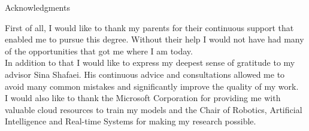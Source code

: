 \makeatletter
{}
\makeatother
\thispagestyle{empty}
\vspace*{20mm}
\begin{center}
\makeatletter
{} Acknowledgments
\makeatother
\end{center}
\vspace{10mm}
First of all, I would like to thank my parents for their continuous support that enabled me to pursue this degree. Without their help I would not have had many of the opportunities that got me where I am today.\\
In addition to that I would like to express my deepest sense of gratitude to my advisor Sina Shafaei. His continuous advice and consultations allowed me to avoid many common mistakes and significantly improve the quality of my work.\\
I would also like to thank the Microsoft Corporation for providing me with valuable cloud resources to train my models and the Chair of Robotics, Artificial Intelligence and Real-time Systems for making my research possible.\\
\cleardoublepage{}
